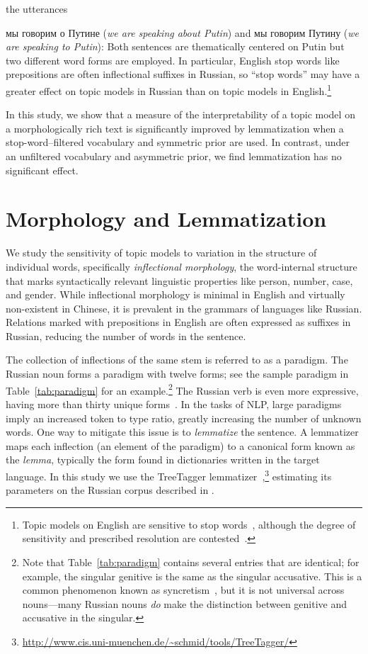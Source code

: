 \documentclass[11pt,letterpaper]{article}
\begin{document}
the utterances {{мы говорим о Путине} ({\em we
are speaking about Putin}) and {{мы
  говорим Путину} ({\em we are speaking to Putin})}: Both sentences
are thematically centered on Putin but two different word forms
are employed.  In particular,
English stop words like prepositions are often inflectional
suffixes in Russian, so ``stop words'' may have a greater effect on
topic models in Russian than on topic models in English.\footnote{
	Topic models on English are sensitive to stop
	words~\cite{wallach2009,blei2010,eisenstein2011},
	although the degree of sensitivity and prescribed
    resolution are contested~\cite{schofield2017}.
}

In this study, we show that a measure of the interpretability of a
topic model on a morphologically rich text is significantly
improved by lemmatization when a stop-word--filtered vocabulary and
symmetric prior are used.  In contrast, under an unfiltered vocabulary
and asymmetric prior, we find lemmatization has no significant effect.


\section{Morphology and Lemmatization}\label{sec:inflectional}

We study the sensitivity of topic models to variation in the structure
of individual words, specifically
{\em inflectional morphology}, the word-internal
structure that marks syntactically relevant linguistic
properties like person, number, case, and gender.
While inflectional morphology is minimal in English and
virtually non-existent in Chinese, it is prevalent in
the grammars of languages like Russian. Relations marked with
prepositions in English are often expressed as suffixes in Russian,
reducing the number of words in the sentence.

The collection of inflections of the same stem is referred to as a
paradigm.  The Russian noun forms a paradigm with twelve
forms; see the sample paradigm in Table~\ref{tab:paradigm} for an
example.\footnote{
  Note that Table~\ref{tab:paradigm} contains several
  entries that are identical; for example, the singular genitive is the same
  as the singular accusative. This is a common phenomenon known as
  syncretism~\cite{baerman2005syntax}, but it is not universal across
  nouns---many Russian nouns {\em do} make the distinction between
  genitive and accusative in the singular.
}
The Russian verb is even more expressive, having more
than thirty unique forms~\cite{wade2010comprehensive}.
In the tasks of NLP, large paradigms imply an increased token to type
ratio, greatly increasing the number of unknown words. One way to
mitigate this issue is to {\em lemmatize} the sentence.  A lemmatizer maps each
inflection (an element of the paradigm) to a canonical form known as
the \emph{lemma}, typically the form found in dictionaries
written in the target language.
In this study we use the TreeTagger
lemmatizer~\cite{schmid1994probabilistic},\footnote{
   \url{http://www.cis.uni-muenchen.de/~schmid/tools/TreeTagger/}
}
estimating its parameters on the Russian corpus described in
.

}
\end{document}
